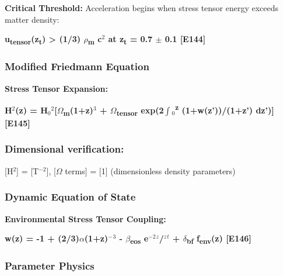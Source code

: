 \documentclass[11pt,a4paper]{article}
\begin{document}
\textbf{Critical Threshold:} Acceleration begins when stress tensor energy exceeds matter density:

\textbf{u\textsubscript{tensor}(z\textsubscript{t}) > (1/\allowbreak{}3) $\rho$\textsubscript{m} c$^{2}$ at z\textsubscript{t} = 0.7 $\pm$ 0.1 [E144]}

\subsubsection{Modified Friedmann Equation}
\textbf{Stress Tensor Expansion:}

\textbf{H$^{2}$(z) = H$_{0}$$^{2}$[$\Omega$\textsubscript{m}(1+z)$^{3}$ + $\Omega$\textsubscript{tensor} exp(2$\int$$_{0}$\textsuperscript{z} (1+w(z'))/(1+z') dz')] [E145]}

\begin{mdframed}[linecolor=accent,linewidth=0.5pt,backgroundcolor=callout-bg,leftline=true,rightline=true,topline=true,bottomline=true,innerleftmargin=8pt,innerrightmargin=8pt,innertopmargin=6pt,innerbottommargin=6pt]
\subsubsection{Dimensional verification:}
[H$^{2}$] = [T$^{-2}$], [$\Omega$ terms] = [1] (dimensionless density parameters) \checkmark{}
\end{mdframed}

\subsubsection{Dynamic Equation of State}
\textbf{Environmental Stress Tensor Coupling:}

\textbf{w(z) = -1 + (2/\allowbreak{}3)$\alpha$(1+z)$^{-}$$^{3}$ - $\beta$\textsubscript{eos} e$^{-2}$$^{z}$/$^{z}$$^{t}$ + $\delta$\textsubscript{bf} f\textsubscript{env}(z) [E146]}

\begin{mdframed}[linecolor=accent,linewidth=0.5pt,backgroundcolor=callout-bg,leftline=true,rightline=true,topline=true,bottomline=true,innerleftmargin=8pt,innerrightmargin=8pt,innertopmargin=6pt,innerbottommargin=6pt]
\subsubsection{Parameter Physics}
\end{mdframed}
\end{document}
